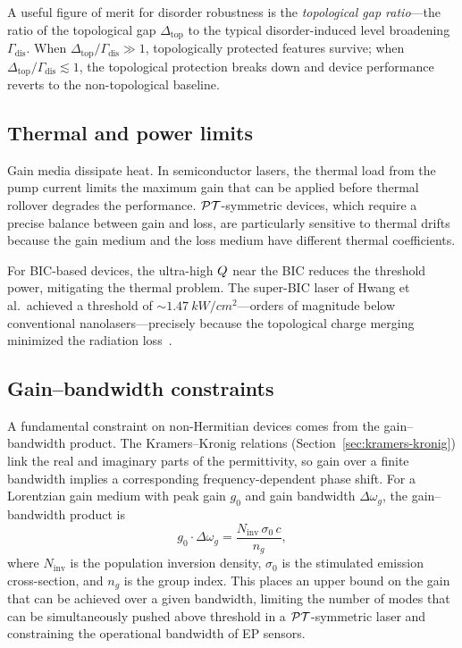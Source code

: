 A useful figure of merit for disorder robustness is the \emph{topological
gap ratio}---the ratio of the topological gap $\Delta_{\mathrm{top}}$
to the typical disorder-induced level broadening $\Gamma_{\mathrm{dis}}$.
When $\Delta_{\mathrm{top}}/\Gamma_{\mathrm{dis}} \gg 1$, topologically
protected features survive; when $\Delta_{\mathrm{top}}/\Gamma_{\mathrm{dis}}
\lesssim 1$, the topological protection breaks down and device
performance reverts to the non-topological baseline.

\subsection{Thermal and power limits}
\label{ssec:thermal}

Gain media dissipate heat. In semiconductor lasers, the thermal load
from the pump current limits the maximum gain that can be applied before
thermal rollover degrades the performance. $\mathcal{PT}$-symmetric devices,
which require a precise balance between gain and loss, are particularly
sensitive to thermal drifts because the gain medium and the loss medium
have different thermal coefficients.

For BIC-based devices, the ultra-high $Q$ near the BIC reduces the
threshold power, mitigating the thermal problem. The super-BIC laser of
Hwang et al.\ achieved a threshold of $\sim\SI{1.47}{kW/cm^2}$---orders
of magnitude below conventional nanolasers---precisely because the
topological charge merging minimized the radiation
loss~\cite{hwang2021ultralow}.

\subsection{Gain--bandwidth constraints}
\label{ssec:gain-bandwidth}

A fundamental constraint on non-Hermitian devices comes from the
gain--bandwidth product. The Kramers--Kronig relations
(Section~\ref{sec:kramers-kronig}) link the real and imaginary parts
of the permittivity, so gain over a finite bandwidth implies a
corresponding frequency-dependent phase shift. For a Lorentzian gain
medium with peak gain $g_0$ and gain bandwidth $\Delta\omega_g$, the
gain--bandwidth product is
\begin{equation}
 g_0 \cdot \Delta\omega_g = \frac{N_{\mathrm{inv}}\,\sigma_0\,c}{n_g},
 \label{eq:gain-bandwidth}
\end{equation}
where $N_{\mathrm{inv}}$ is the population inversion density,
$\sigma_0$ is the stimulated emission cross-section, and $n_g$ is the
group index. This places an upper bound on the gain that can be
achieved over a given bandwidth, limiting the number of modes that can
be simultaneously pushed above threshold in a $\mathcal{PT}$-symmetric laser
and constraining the operational bandwidth of EP sensors.

